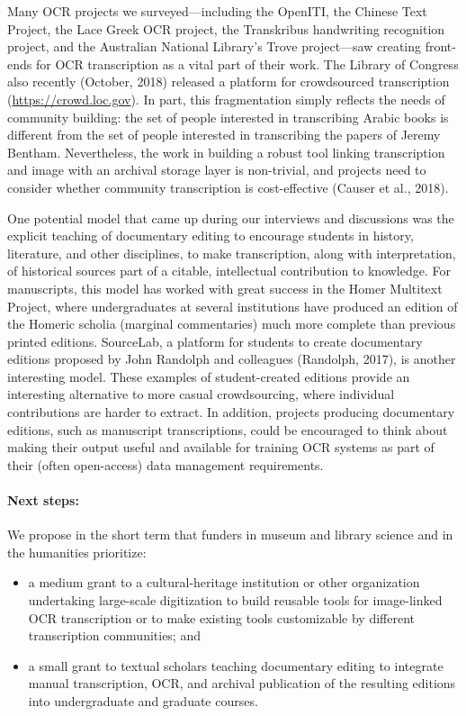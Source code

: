 \documentclass[twoside,11pt]{report}
\begin{document}
Many OCR projects we surveyed---including the OpenITI, the Chinese Text Project, the Lace Greek OCR project, the Transkribus handwriting recognition project, and the Australian National Library's Trove project---saw creating front-ends for OCR transcription as a vital part of their work. The Library of Congress also recently (October, 2018) released a platform for crowdsourced transcription (\url{https://crowd.loc.gov}). In part, this fragmentation simply reflects the needs of community building: the set of people interested in transcribing Arabic books is different from the set of people interested in transcribing the papers of Jeremy Bentham. Nevertheless, the work in building a robust tool linking transcription and image with an archival storage layer is non-trivial, and projects need to consider whether community transcription is cost-effective (Causer et al., 2018).

One potential model that came up during our interviews and discussions was the explicit teaching of documentary editing to encourage students in history, literature, and other disciplines, to make transcription, along with interpretation, of historical sources part of a citable, intellectual contribution to knowledge. For manuscripts, this model has worked with great success in the Homer Multitext Project, where undergraduates at several institutions have produced an edition of the Homeric scholia (marginal commentaries) much more complete than previous printed editions. SourceLab, a platform for students to create documentary editions proposed by John Randolph and colleagues (Randolph, 2017), is another interesting model. These examples of student-created editions provide an interesting alternative to more casual crowdsourcing, where individual contributions are harder to extract. In addition, projects producing documentary editions, such as manuscript transcriptions, could be encouraged to think about making their output useful and available for training OCR systems as part of their (often open-access) data management requirements.

\paragraph{Next steps:} We propose in the short term that funders in museum and library science and in the humanities prioritize:
\begin{itemize}

\item a medium grant to a cultural-heritage institution or other organization undertaking large-scale digitization to build reusable tools for image-linked OCR transcription or to make existing tools customizable by different transcription communities; and

\item a small grant to textual scholars teaching documentary editing to integrate manual transcription, OCR, and archival publication of the resulting editions into undergraduate and graduate courses.

\end{itemize}
\end{document}
